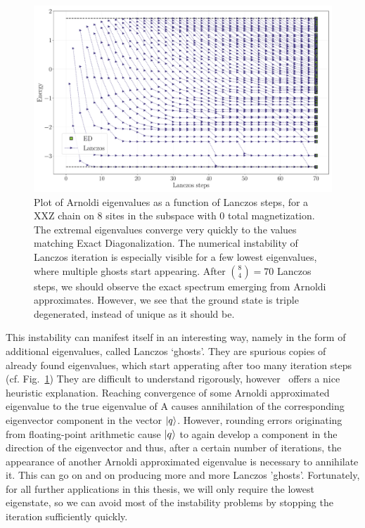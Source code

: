 \begin{figure}[htbp]
	\centering
	\includegraphics[width=\linewidth]{Figures/lanczos_L_8.pdf}
	\caption{Plot of Arnoldi eigenvalues as a function of Lanczos steps, for a XXZ chain on \(8\) sites in the
	subspace with \(0\) total magnetization. The extremal eigenvalues converge very quickly to the values matching
	Exact Diagonalization. The numerical instability of Lanczos iteration is especially visible for a few lowest
	eigenvalues, where multiple ghosts start appearing. After \(\binom{8}{4} = 70\) Lanczos steps, 
	we should observe the exact spectrum emerging from Arnoldi approximates. However,
	we see that the ground state is triple degenerated, instead of unique as it should be.}
	\label{fig:ghosts}
\end{figure}

This instability can manifest itself in an interesting way, namely in the form of additional eigenvalues, called Lanczos `ghosts'.
They are spurious copies of already found eigenvalues, which start apperating after too many iteration steps (cf. Fig.~\ref{fig:ghosts})
They are difficult to understand rigorously, however~\textcite{Trefethen1997} offers a nice heuristic explanation.
Reaching convergence of some Arnoldi approximated eigenvalue to the true eigenvalue of A causes annihilation
of the corresponding eigenvector component in the vector \(\ket{q}\). However, rounding errors originating from
floating-point arithmetic cause \(\ket{q}\) to again develop a component in the direction of the eigenvector
and thus, after a certain number of iterations, the appearance of another Arnoldi approximated eigenvalue is necessary
to annihilate it. This can go on and on producing more and more Lanczos 'ghosts'.
Fortunately, for all further applications in this thesis, we will only require the lowest eigenstate, so we can
avoid most of the instability problems by stopping the iteration sufficiently quickly.

